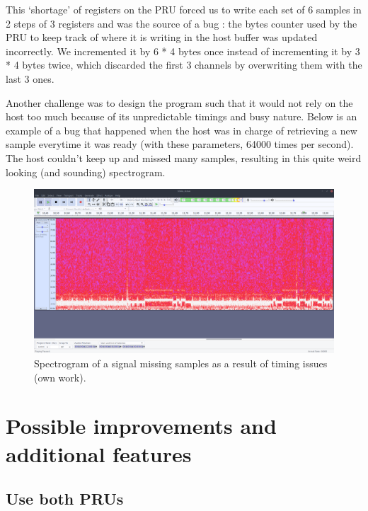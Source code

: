 \documentclass[]{report}
\begin{document}
This `shortage' of registers on the PRU forced us to write each set of 6 samples in 2 steps of 3 registers and was the source of a bug : the bytes counter used by the PRU to keep track of where it is writing in the host buffer was updated incorrectly. We incremented it by 6 * 4 bytes once instead of incrementing it by 3 * 4 bytes twice, which discarded the first 3 channels by overwriting them with the last 3 ones.

Another challenge was to design the program such that it would not rely on the host too much because of its unpredictable timings and busy nature. Below is an example of a bug that happened when the host was in charge of retrieving a new sample everytime it was ready (with these parameters, 64000 times per second). The host couldn't keep up and missed many samples, resulting in this quite weird looking (and sounding) spectrogram.

\begin{figure}[H]
\centering
\includegraphics[width=1.0\linewidth]{Pictures/timing_bug.png}
\caption{Spectrogram of a signal missing samples as a result of timing
issues (own work).}
\end{figure}

\hypertarget{possible-improvements-and-additional-features}{%
\chapter{Possible improvements and additional
features}\label{possible-improvements-and-additional-features}}

\hypertarget{use-both-prus}{%
\section{Use both PRUs}\label{use-both-prus}}
\end{document}
